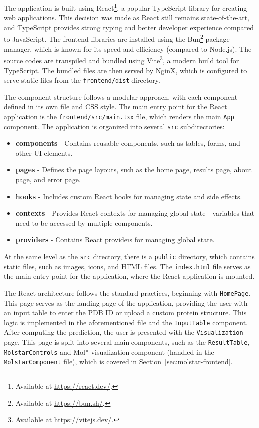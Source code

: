 The application is built using React\footnote{Available at \url{https://react.dev/}.}, a popular TypeScript library for creating web applications. This decision was made as React still remains state-of-the-art, and TypeScript provides strong typing and better developer experience compared to JavaScript. The frontend libraries are installed using the Bun\footnote{Available at \url{https://bun.sh/}.} package manager, which is known for its speed and efficiency (compared to Node.js). The source codes are transpiled and bundled using Vite\footnote{Available at \url{https://vitejs.dev/}.}, a modern build tool for TypeScript. The bundled files are then served by NginX, which is configured to serve static files from the \lstinline!frontend/dist! directory.

The component structure follows a modular approach, with each component defined in its own file and CSS style. The main entry point for the React application is the \lstinline!frontend/src/main.tsx! file, which renders the main \lstinline!App! component. The application is organized into several \lstinline|src| subdirectories:

\begin{itemize}
    \item \textbf{components} - Contains reusable components, such as tables, forms, and other UI elements.
    \item \textbf{pages} - Defines the page layouts, such as the home page, results page, about page, and error page.
    \item \textbf{hooks} - Includes custom React hooks for managing state and side effects.
    \item \textbf{contexts} - Provides React contexts for managing global state - variables that need to be accessed by multiple components.
    \item \textbf{providers} - Contains React providers for managing global state.
\end{itemize}

At the same level as the \lstinline|src| directory, there is a \lstinline!public! directory, which contains static files, such as images, icons, and HTML files. The \lstinline!index.html! file serves as the main entry point for the application, where the React application is mounted.

The React architecture follows the standard practices, beginning with \lstinline|HomePage|. This page serves as the landing page of the application, providing the user with an input table to enter the PDB ID or upload a custom protein structure. This logic is implemented in the aforementioned file and the \lstinline|InputTable| component. After computing the prediction, the user is presented with the \lstinline|Visualization| page. This page is split into several main components, such as the \lstinline|ResultTable|, \lstinline|MolstarControls| and Mol* visualization component (handled in the \lstinline|MolstarComponent| file), which is covered in Section~\ref{sec:molstar-frontend}.

